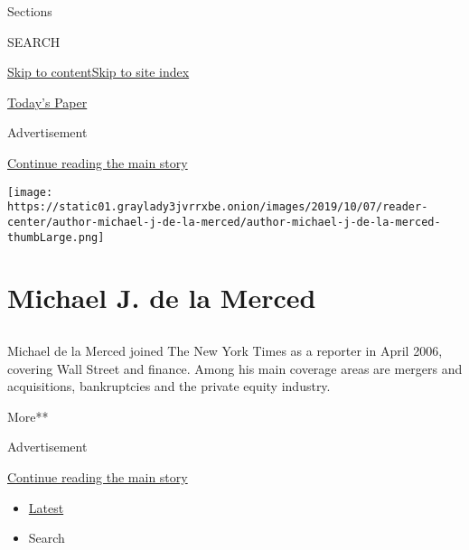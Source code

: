 Sections

SEARCH

\protect\hyperlink{site-content}{Skip to
content}\protect\hyperlink{site-index}{Skip to site index}

\href{https://myaccount.nytimes3xbfgragh.onion/auth/login?response_type=cookie\&client_id=vi}{}

\href{https://www.nytimes3xbfgragh.onion/section/todayspaper}{Today's
Paper}

Advertisement

\protect\hyperlink{after-top}{Continue reading the main story}

\texttt{[image: https://static01.graylady3jvrrxbe.onion/images/2019/10/07/reader-center/author-michael-j-de-la-merced/author-michael-j-de-la-merced-thumbLarge.png]}

\hypertarget{michael-j-de-la-merced}{%
\section{Michael J. de la Merced}\label{michael-j-de-la-merced}}

\subsection{}

Michael de la Merced joined The New York Times as a reporter in April
2006, covering Wall Street and finance. Among his main coverage areas
are mergers and acquisitions, bankruptcies and the private equity
industry.

More**

Advertisement

\protect\hyperlink{after-mid1}{Continue reading the main story}

\begin{itemize}
\tightlist
\item
  \protect\hyperlink{stream-panel}{Latest}
\item
  Search
\end{itemize}

